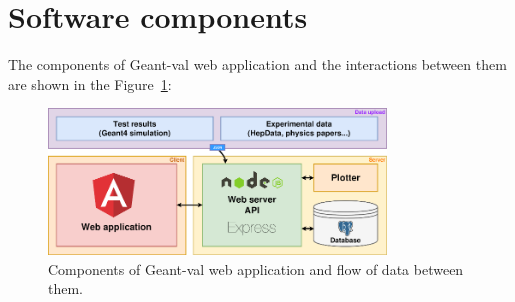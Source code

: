\section{Software components}
\label{sec-webapplication}

The components of \textsf{Geant-val} web application and the interactions between them are shown in the Figure~\ref{fig:gvp_dataflow}:

\begin{figure}[h]
    \centering
    \includegraphics[width=0.8\textwidth,clip]{schema.png}
    \caption{Components of \textsf{Geant-val} web application and flow of data between them.}
    \label{fig:gvp_dataflow}
\end{figure}

